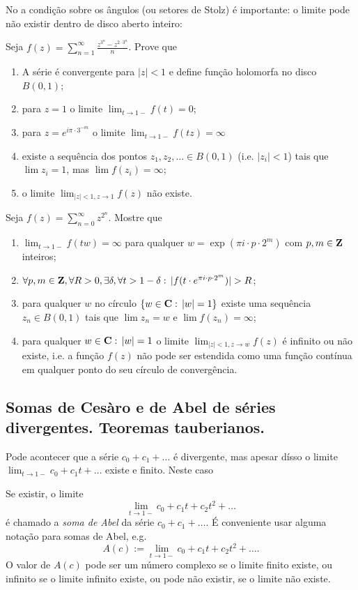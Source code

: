 No  a condição sobre os ângulos (ou setores de Stolz) é importante:
o limite pode não existir dentro de disco aberto inteiro:

\begin{problema}
Seja $f(z) = \sum_{n=1}^\infty \frac{z^{3^n} - z^{2\cdot 3^n}}{n}$.
Prove que
\begin{enumerate}
\item A série é convergente para $|z|<1$ e define função holomorfa no disco $B(0,1)$;
\item para $z=1$ o limite $\lim_{t\to1-} f(t) = 0$;
\item para $z=e^{i\pi\cdot 3^{-m}}$ o limite $\lim_{t\to1-} f(tz) = \infty$
\item existe a sequência dos pontos $z_1,z_2,\dots\in B(0,1)$ (i.e. $|z_i|<1$)
tais que $\lim z_i = 1$, mas $\lim f(z_i) = \infty$;
\item o limite $\lim_{|z|<1,z\to 1} f(z)$ não existe.
\end{enumerate}
\end{problema}

\begin{problema}
Seja $f(z) = \sum_{n=0}^\infty z^{2^n}$.
Mostre que
\begin{enumerate}
\item $\lim_{t\to 1-} f(tw) = \infty$
para qualquer $w=\exp(\pi i\cdot p\cdot 2^m)$
com $p,m\in\mathbf{Z}$ inteiros;
\item $\forall p,m\in\Z, \forall R>0,\exists\delta,\forall t>1-\delta: \, |f(t\cdot e^{\pi i \cdot p\cdot 2^m})|>R $;
\item para qualquer $w$ no círculo $\{w\in\mathbf{C}:\,|w|=1\}$ existe uma sequência $z_n\in B(0,1)$ tais que
$\lim z_n = w$ e $\lim f(z_n) = \infty$;
\item para qualquer $w\in\mathbf{C}:\,|w|=1$ o limite $\lim_{|z|<1,z\to w} f(z)$ é infinito ou não existe,
i.e. a função $f(z)$ não pode ser estendida como uma função contínua
em qualquer ponto do seu círculo de convergência.
\end{enumerate}
\end{problema}

\subsection{Somas de Cesàro e de Abel de séries divergentes. Teoremas tauberianos.}

Pode acontecer que a série $c_0 + c_1 + \dots$ é divergente,
mas apesar dísso o limite $\lim_{t\to1-} c_0 + c_1 t + \dots$ existe e finito.
Neste caso 
\begin{defin}
Se existir, o limite
\[ \lim_{t\to1-} c_0 + c_1 t + c_2 t^2 + \dots \]
é chamado a \emph{soma de Abel} da série $c_0 + c_1 + \dots$.
É conveniente usar alguma notação para somas de Abel,
e.g. 
\begin{equation}
A(c) := \lim_{t\to1-} c_0 + c_1 t + c_2 t^2 + \dots .
\end{equation}
O valor de $A(c)$ pode ser um número complexo se o limite finito existe,
ou infinito se o limite infinito existe, ou pode não existir, se o limite não existe.
\end{defin}

